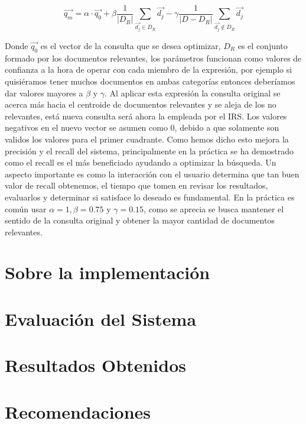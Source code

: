 \documentclass[runningheads,a4paper]{llncs}
\begin{document}
\begin{equation}
	\overrightarrow{q_m} = \alpha · \overrightarrow{q_0} + \beta \frac{1}{|D_R|} \sum_{\overrightarrow{d_j} \in D_R} \overrightarrow{d_j} - \gamma \frac{1}{|D - D_R|} \sum_{\overrightarrow{d_j} \notin D_R} \overrightarrow{d_j}
\end{equation}

Donde $\overrightarrow{q_0}$ es el vector de la consulta que se desea optimizar, $D_R$ es el conjunto formado por los documentos relevantes, los parámetros funcionan como valores de confianza a la hora de operar con cada miembro de la expresión, por ejemplo si quisiéramos tener muchos documentos en ambas categorías entonces deberíamos dar valores mayores a $\beta$ y $\gamma$. Al aplicar esta expresión la consulta original se acerca más hacia el centroide de documentos relevantes y se aleja de los no relevantes, está nueva consulta será ahora la empleada por el IRS. Los valores negativos en el nuevo vector se asumen como 0, debido a que solamente son validos los valores para el primer cuadrante. Como hemos dicho esto mejora la precisión y el recall del sistema, principalmente en la práctica se ha demostrado como el recall es el más beneficiado ayudando a optimizar la búsqueda. Un aspecto importante es como la interacción con el usuario determina que tan buen valor de recall obtenemos, el tiempo que tomen en revisar los resultados, evaluarlos y determinar si satisface lo deseado es fundamental. En la práctica es común usar $\alpha = 1, \beta = 0.75$ y $\gamma = 0.15$, como se aprecia se busca mantener el sentido de la consulta original y obtener la mayor cantidad de documentos relevantes.

\section{Sobre la implementación} %

\section{Evaluación del Sistema}

\section{Resultados Obtenidos}

\section{Recomendaciones}
\end{document}
